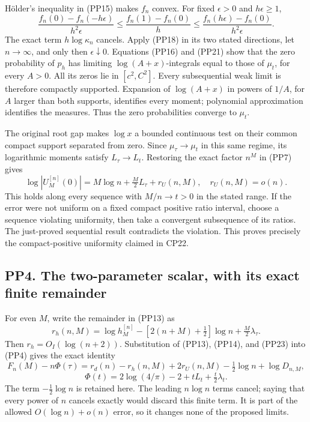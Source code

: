 \documentclass[10pt]{article}
\begin{document}
Hölder's inequality in (PP15) makes \(f_n\) convex. For fixed \(\epsilon>0\) and \(h\epsilon\ge1\), \[
\frac{f_n(0)-f_n(-h\epsilon)}{h^2\epsilon}
\le\frac{f_n(1)-f_n(0)}h
\le\frac{f_n(h\epsilon)-f_n(0)}{h^2\epsilon}.
\tag{PP22}
\] The exact term \(h\log\kappa_n\) cancels. Apply (PP18) in its two stated directions, let \(n\to\infty\), and only then \(\epsilon\downarrow0\). Equations (PP16) and (PP21) show that the zero probability of \(p_h\) has limiting \(\log(A+x)\)-integrals equal to those of \(\mu_t\), for every \(A>0\). All its zeros lie in \([c^2,C^2]\). Every subsequential weak limit is therefore compactly supported. Expansion of \(\log(A+x)\) in powers of \(1/A\), for \(A\) larger than both supports, identifies every moment; polynomial approximation identifies the measures. Thus the zero probabilities converge to \(\mu_t\).

The original root gap makes \(\log x\) a bounded continuous test on their common compact support separated from zero. Since \(\mu_\tau\to\mu_t\) in this same regime, its logarithmic moments satisfy \(L_\tau\to L_t\). Restoring the exact factor \(n^M\) in (PP7) gives \[
\boxed{\log|U_M^{[n]}(0)|=M\log n+\tfrac M2L_\tau+r_U(n,M),
\quad r_U(n,M)=o(n).}
\tag{PP23}
\] This holds along every sequence with \(M/n\to t>0\) in the stated range. If the error were not uniform on a fixed compact positive ratio interval, choose a sequence violating uniformity, then take a convergent subsequence of its ratios. The just-proved sequential result contradicts the violation. This proves precisely the compact-positive uniformity claimed in CP22.

\subsection{PP4. The two-parameter scalar, with its exact finite remainder}\label{pp4.-the-two-parameter-scalar-with-its-exact-finite-remainder}

For even \(M\), write the remainder in (PP13) as \[
r_h(n,M)=\log h_M^{[n]}-[2(n+M)+\tfrac12]\log n+\tfrac M2\lambda_\tau.
\] Then \(r_h=O_I(\log(n+2))\). Substitution of (PP13), (PP14), and (PP23) into (PP4) gives the exact identity \[
\boxed{
F_n(M)-n\Phi(\tau)
=r_d(n)-r_h(n,M)+2r_U(n,M)-\tfrac12\log n+\log D_{n,M},
}
\tag{PP24}
\] \[
\Phi(t)=2\log(4/\pi)-2+tL_t+\tfrac t2\lambda_t.
\tag{PP25}
\] The term \(-\tfrac12\log n\) is retained here. The leading \(n\log n\) terms cancel; saying that every power of \(n\) cancels exactly would discard this finite term. It is part of the allowed \(O(\log n)+o(n)\) error, so it changes none of the proposed limits.
\end{document}

